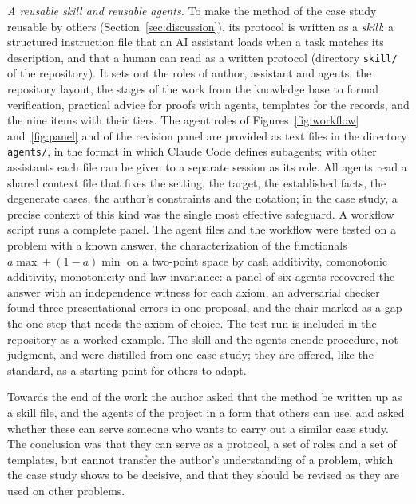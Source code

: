 \emph{A reusable skill and reusable agents.} To make the method of the case study reusable by others
(Section~\ref{sec:discussion}), its protocol is written as a \emph{skill}: a structured instruction file that an AI
assistant loads when a task matches its description, and that a human can read as a written protocol (directory
\texttt{skill/} of the repository). It sets out the roles of author, assistant and agents, the repository layout, the
stages of the work from the knowledge base to formal verification, practical advice for proofs with agents,
templates for the records, and the nine items with their tiers. The agent roles of Figures~\ref{fig:workflow}
and~\ref{fig:panel} and of the revision panel are provided as text files in the directory \texttt{agents/}, in the
format in which Claude Code defines subagents; with other assistants each file can be given to a separate session as
its role. All agents read a shared context file that fixes the setting, the target, the established facts, the
degenerate cases, the author's constraints and the notation; in the case study, a precise context of this kind was
the single most effective safeguard. A workflow script runs a complete panel. The agent files and the workflow were
tested on a problem with a known answer, the characterization of the functionals $a\max+(1-a)\min$ on a two-point
space by cash additivity, comonotonic additivity, monotonicity and law invariance: a panel of six agents recovered the
answer with an independence witness for each axiom, an adversarial checker found three presentational errors in one
proposal, and the chair marked as a gap the one step that needs the axiom of choice. The test run is included in the
repository as a worked example. The skill and the agents encode procedure, not judgment, and were distilled from one
case study; they are offered, like the standard, as a starting point for others to adapt.

\begin{discussion}
Towards the end of the work the author asked that the method be written up as a skill file, and the agents of the
project in a form that others can use, and asked whether these can serve someone who wants to carry out a similar
case study. The conclusion was that they can serve as a protocol, a set of roles and a set of templates, but cannot
transfer the author's understanding of a problem, which the case study shows to be decisive, and that they should be
revised as they are used on other problems.
\end{discussion}


